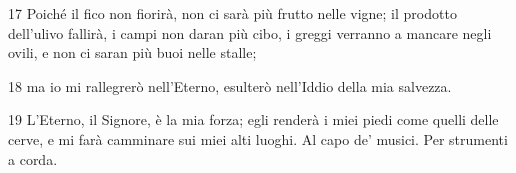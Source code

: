 \par 17 Poiché il fico non fiorirà, non ci sarà più frutto nelle vigne; il prodotto dell'ulivo fallirà, i campi non daran più cibo, i greggi verranno a mancare negli ovili, e non ci saran più buoi nelle stalle;
\par 18 ma io mi rallegrerò nell'Eterno, esulterò nell'Iddio della mia salvezza.
\par 19 L'Eterno, il Signore, è la mia forza; egli renderà i miei piedi come quelli delle cerve, e mi farà camminare sui miei alti luoghi. Al capo de' musici. Per strumenti a corda.


